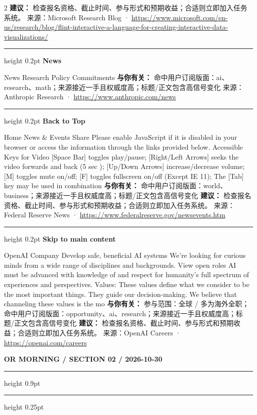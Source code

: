 \documentclass[10.5pt]{ctexart}
\begin{document}
\begin{multicols}{2}
\textbf{建议：} 检查报名资格、截止时间、参与形式和预期收益；合适则立即加入任务系统。
{\footnotesize\color{ormuted} 来源：Microsoft Research Blog · \url{https://www.microsoft.com/en-us/research/blog/flint-interactive-a-language-for-creating-interactive-data-visualizations/}}
\vspace{2mm}
\hrule height 0.2pt
\vspace{2mm}
{\large\bfseries News}\par
News Research Policy Commitments
\textbf{与你有关：} 命中用户订阅版面：ai、research、math；来源接近一手且权威度高；标题/正文包含高信号变化
{\footnotesize\color{ormuted} 来源：Anthropic Research · \url{https://www.anthropic.com/news}}
\vspace{2mm}
\hrule height 0.2pt
\vspace{2mm}
{\large\bfseries Back to Top}\par
Home News \& Events Share Please enable JavaScript if it is disabled in your browser or access the information through the links provided below. Accessible Keys for Video [Space Bar] toggles play/pause; [Right/Left Arrows] seeks the video forwards and back (5 sec ); [Up/Down Arrows] increase/decrease volume; [M] toggles mute on/off; [F] toggles fullscreen on/off (Except IE 11); The [Tab] key may be used in combination
\textbf{与你有关：} 命中用户订阅版面：world、business；来源接近一手且权威度高；标题/正文包含高信号变化
\textbf{建议：} 检查报名资格、截止时间、参与形式和预期收益；合适则立即加入任务系统。
{\footnotesize\color{ormuted} 来源：Federal Reserve News · \url{https://www.federalreserve.gov/newsevents.htm}}
\vspace{2mm}
\hrule height 0.2pt
\vspace{2mm}
{\large\bfseries Skip to main content}\par
OpenAI Company Develop safe, beneficial AI systems We’re looking for curious minds from a wide range of disciplines and backgrounds. View open roles AI must be advanced with knowledge of and respect for humanity’s full spectrum of experiences and perspectives. Values: These values define what we consider to be the most important things. They guide our decision-making. We believe that channeling these values is the mo
\textbf{与你有关：} 参与范围：全球 / 多为海外全职；命中用户订阅版面：opportunity、ai、research；来源接近一手且权威度高；标题/正文包含高信号变化
\textbf{建议：} 检查报名资格、截止时间、参与形式和预期收益；合适则立即加入任务系统。
{\footnotesize\color{ormuted} 来源：OpenAI Careers · \url{https://openai.com/careers}}
\end{multicols}
\newpage
{\small\bfseries OR MORNING / SECTION 02 / 2026-10-30}
\vspace{2mm}
\hrule height 0.9pt
\vspace{1.5mm}
\hrule height 0.25pt
\vspace{4mm}
\end{document}
